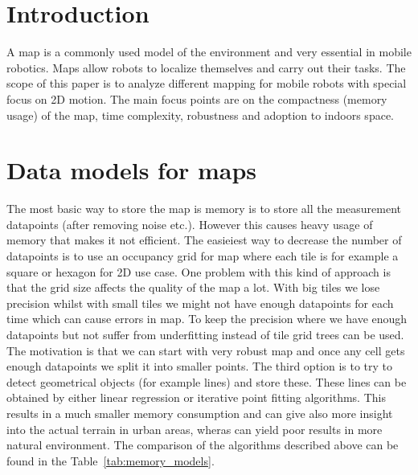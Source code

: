 \documentclass[12pt, a4paper, onecolumn]{article}
\begin{document}
\maketitle

\section{Introduction}
A map is a commonly used model of the environment and very essential in mobile robotics. Maps allow robots to localize themselves and carry out their tasks.
The scope of this paper is to analyze different mapping for mobile robots with special focus on 2D motion.
The main focus points are on the compactness (memory usage) of the map, time complexity, robustness and adoption to indoors space.


\section{Data models for maps}
The most basic way to store the map is memory is to store all the measurement datapoints (after removing noise etc.).
However this causes heavy usage of memory that makes it not efficient.
The easieiest way to decrease the number of datapoints is to use an occupancy grid for map where each tile is for example a square or hexagon for 2D use case.
One problem with this kind of approach is that the grid size affects the quality of the map a lot.
With big tiles we lose precision whilst with small tiles we might not have enough datapoints for each time which can cause errors in map.
To keep the precision where we have enough datapoints but not suffer from underfitting instead of tile grid trees can be used.
The motivation is that we can start with very robust map and once any cell gets enough datapoints we split it into smaller points.
The third option is to try to detect geometrical objects (for example lines) and store these.
These lines can be obtained by either linear regression or iterative point fitting algorithms.
This results in a much smaller memory consumption and can give also more insight into the actual terrain in urban areas, wheras can yield poor results in more natural environment.
\cite{AlgorithmsForIndoorMapping}
The comparison of the algorithms described above can be found in the Table~\ref{tab:memory_models}.
\end{document}
